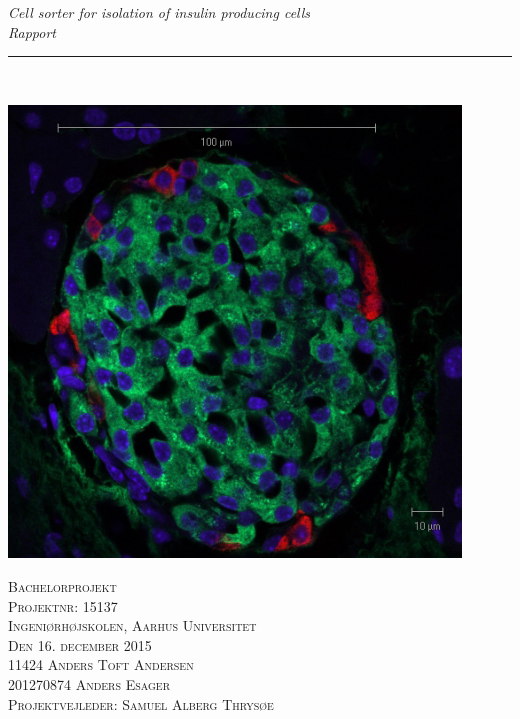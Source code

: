 \thispagestyle{empty}
\begin{center}
\vspace{3cm}

\phantom{hul}

\phantom{hul}

\phantom{hul}

\textsl{\LARGE Cell sorter for isolation of insulin producing cells} \\ \vspace{0.25cm}
\textsl{\Large Rapport} \\ %

\rule{13cm}{3mm} \\ \vspace{1cm}

\includegraphics[width=0.9\textwidth]{billeder/forside.jpg}

\textsc{\center Bachelorprojekt \\
Projektnr: 15137 \\
Ingeniørhøjskolen, Aarhus Universitet \\
Den 16. december 2015 \\ \vspace{1cm}
11424	Anders Toft Andersen \\
201270874	Anders Esager \\
Projektvejleder: Samuel Alberg Thrysøe \\}
\end{center}
